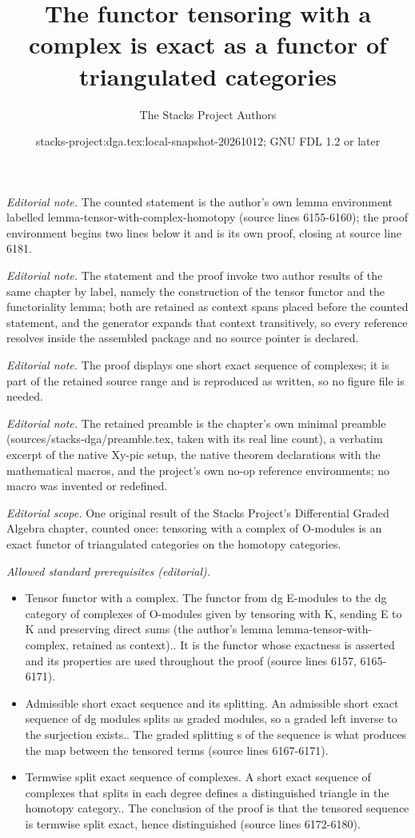 \documentclass{stacks-project}
\title{The functor tensoring with a complex is exact as a functor of triangulated categories}
\author{The Stacks Project Authors}
\date{stacks-project:dga.tex:local-snapshot-20261012; GNU FDL 1.2 or later}
\theoremstyle{plain}
\theoremstyle{definition}
\theoremstyle{remark}
\numberwithin{equation}{subsection}
\begin{document}
\maketitle
\noindent\textit{Editorial note.} The counted statement is the author's own lemma environment labelled lemma-tensor-with-complex-homotopy (source lines 6155-6160); the proof environment begins two lines below it and is its own proof, closing at source line 6181.\par\medskip
\noindent\textit{Editorial note.} The statement and the proof invoke two author results of the same chapter by label, namely the construction of the tensor functor and the functoriality lemma; both are retained as context spans placed before the counted statement, and the generator expands that context transitively, so every reference resolves inside the assembled package and no source pointer is declared.\par\medskip
\noindent\textit{Editorial note.} The proof displays one short exact sequence of complexes; it is part of the retained source range and is reproduced as written, so no figure file is needed.\par\medskip
\noindent\textit{Editorial note.} The retained preamble is the chapter's own minimal preamble (sources/stacks-dga/preamble.tex, taken with its real line count), a verbatim excerpt of the native Xy-pic setup, the native theorem declarations with the mathematical macros, and the project's own no-op reference environments; no macro was invented or redefined.\par\medskip
\noindent\textit{Editorial scope.} One original result of the Stacks Project's Differential Graded Algebra chapter, counted once: tensoring with a complex of O-modules is an exact functor of triangulated categories on the homotopy categories.\par\medskip
\noindent\textit{Allowed standard prerequisites (editorial).}\begin{itemize}
\item Tensor functor with a complex. The functor from dg E-modules to the dg category of complexes of O-modules given by tensoring with K, sending E to K and preserving direct sums (the author's lemma lemma-tensor-with-complex, retained as context).. It is the functor whose exactness is asserted and its properties are used throughout the proof (source lines 6157, 6165-6171).
\item Admissible short exact sequence and its splitting. An admissible short exact sequence of dg modules splits as graded modules, so a graded left inverse to the surjection exists.. The graded splitting s of the sequence is what produces the map between the tensored terms (source lines 6167-6171).
\item Termwise split exact sequence of complexes. A short exact sequence of complexes that splits in each degree defines a distinguished triangle in the homotopy category.. The conclusion of the proof is that the tensored sequence is termwise split exact, hence distinguished (source lines 6172-6180).
\end{itemize}\medskip
\end{document}

